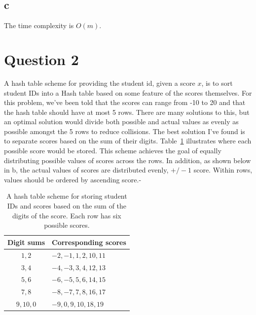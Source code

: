 \documentclass[12pt]{article}
\begin{document}
\subsection*{c}  The time complexity is $O(m)$.
\clearpage
\section*{Question 2}
A hash table scheme for providing the student id, given a score $x$, is to sort student IDs into a Hash table based on some feature of the scores themselves.  For this problem, we've been told that the scores can range from -10 to 20 and that the hash table should have at most 5 rows.  There are many solutions to this, but an optimal solution would divide both possible and actual values as evenly as possible amongst the 5 rows to reduce collisions.  The best solution I've found is to separate scores based on the sum of their digits.  Table~\ref{hashintro} illustrates where each possible score would be stored.  This scheme achieves the goal of equally distributing possible values of scores across the rows.  In addition, as shown below in b, the actual values of scores are distributed evenly, $+/- 1$ score.  Within rows, values should be ordered by ascending score.-

\begin{table}[h]
\centering
\begin{tabular}{c|l}
Digit sums & Corresponding scores\\\hline
$1, 2$ & $-2,-1,1,2,10,11$\\
$3,4$ & $-4,-3,3,4,12,13$\\
$5,6$ & $-6,-5,5,6,14,15$\\
$7,8$ & $-8,-7,7,8,16,17$\\
$9,10,0$ & $-9,0,9,10,18,19$\\
\end{tabular}
\caption{A hash table scheme for storing student IDs and scores based on the sum of the digits of the score.  Each row has six possible scores.}
\label{hashintro}
\end{table}
\end{document}
